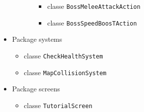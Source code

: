 \documentclass[a4paper,12pt]{report}
\begin{document}
\begin{itemize}
\begin{itemize}
\begin{itemize}
			\begin{itemize}
				\item classe \texttt{BossMeleeAttackAction}
				\item classe \texttt{BossSpeedBoosTAction}
			\end{itemize}
		\end{itemize}
	\end{itemize}
	\item Package systems
	\begin{itemize}
		\item classe \texttt{CheckHealthSystem}
		\item classe \texttt{MapCollisionSystem}
	\end{itemize}
	\item Package screens
	\begin{itemize}
		\item classe \texttt{TutorialScreen}
	\end{itemize}
\end{itemize}
\end{document}
